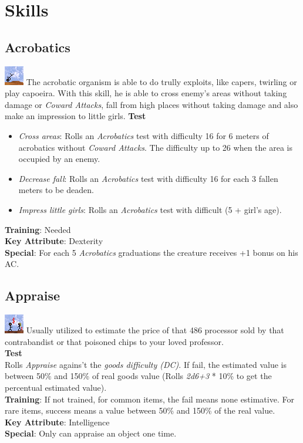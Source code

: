 \documentclass[ letterpaper,12pt]{article}
\begin{document}
\section{Skills}

\subsection{Acrobatics}
\includegraphics{../data/skills/Img/acrobacias.png}
 The acrobatic organism is able to do trully exploits, like capers, twirling or play capoeira. With this skill, he is able to cross enemy's areas without taking damage or {\it Coward Attacks}, fall from high places without taking damage and also make an impression to little girls.
{\bf Test}
\begin{itemize}
\item{{\it Cross areas}: Rolls an {\it Acrobatics} test with difficulty 16 for 6 meters of acrobatics without {\it Coward Attacks}. The difficulty up to 26 when the area is occupied by an enemy.}
\item{{\it Decrease fall}: Rolls an {\it Acrobatics} test with difficulty 16 for each 3 fallen meters to be deaden.}
\item{{\it Impress little girls}: Rolls an {\it Acrobatics} test with difficult (5 + girl's age).}
\end{itemize}
{\bf Training}: Needed\\
{\bf Key Attribute}: Dexterity\\
{\bf Special}: For each 5 {\it Acrobatics} graduations the creature receives +1 bonus on his AC.

\subsection{Appraise}
\includegraphics{../data/skills/Img/avaliar.png}
Usually utilized to estimate the price of that 486 processor sold by that contrabandist or that poisoned chips to your loved professor.\\
{\bf Test}\\
Rolls {\it Appraise} agains't the {\it goods difficulty (DC)}. If fail, the estimated value is between 50\% and 150\% of real goods value (Rolls {\it 2d6+3} * 10\% to get the percentual estimated value).\\
{\bf Training}: If not trained, for common items, the fail means none estimative. For rare items, success means a value between 50\% and 150\% of the real value.\\
{\bf Key Attribute}: Intelligence\\
{\bf Special}: Only can appraise an object one time.
\end{document}
